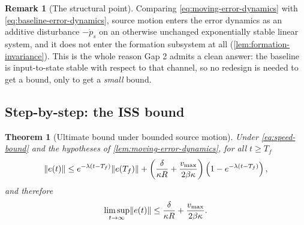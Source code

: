 \documentclass[11pt,a4paper]{article}
\theoremstyle{plain}
\newtheorem{theorem}{Theorem}
\theoremstyle{definition}
\newtheorem{remark}{Remark}
\DeclarePairedDelimiter{\norm}{\lVert}{\rVert}
\begin{document}
\begin{remark}[The structural point]\label{rem:moving-structure}
Comparing \eqref{eq:moving-error-dynamics} with \eqref{eq:baseline-error-dynamics}, source motion
enters the error dynamics as an additive disturbance $-\dot p_s$ on an otherwise unchanged
exponentially stable linear system, and it does not enter the formation subsystem at all
(\cref{lem:formation-invariance}). This is the whole reason Gap 2 admits a clean answer: the
baseline is input-to-state stable with respect to that channel, so no redesign is needed to get a
bound, only to get a \emph{small} bound.
\end{remark}

\subsection{Step-by-step: the ISS bound}\label{sec:gap2-iss}

\begin{theorem}[Ultimate bound under bounded source motion]\label{thm:moving-iss}
Under \eqref{eq:speed-bound} and the hypotheses of \cref{lem:moving-error-dynamics}, for all
$t\geq T_f$
\begin{equation}\label{eq:moving-transient}
    \norm{e(t)}\leq e^{-\lambda(t-T_f)}\norm{e(T_f)}
    +\left(\frac{\delta}{\kappa R}+\frac{v_{\max}}{2\beta\kappa}\right)
    \left(1-e^{-\lambda(t-T_f)}\right),
\end{equation}
and therefore
\begin{equation}\label{eq:moving-ultimate-bound}
    \limsup_{t\to\infty}\norm{e(t)}
    \leq\frac{\delta}{\kappa R}+\frac{v_{\max}}{2\beta\kappa}.
\end{equation}
\end{theorem}
\end{document}
